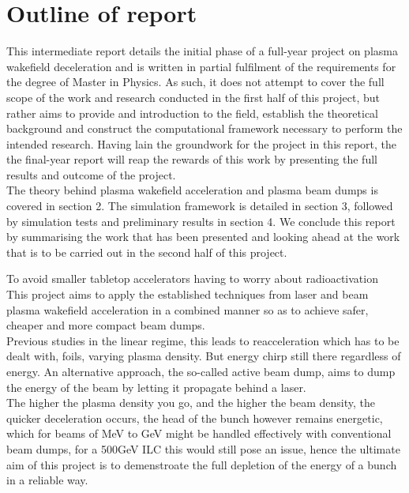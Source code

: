 \section{Outline of report}
This intermediate report details the initial phase of a full-year project on plasma wakefield deceleration and is written in partial fulfilment of the requirements for the degree of Master in Physics. As such, it does not attempt to cover the full scope of the work and research conducted in the first half of this project, but rather aims to provide and introduction to the field, establish the theoretical background and construct the computational framework necessary to perform the intended research. Having lain the groundwork for the project in this report, the the final-year report will reap the rewards of this work by presenting the full results and outcome of the project.\\
The theory behind plasma wakefield acceleration and plasma beam dumps is covered in section 2. The simulation framework is detailed in section 3, followed by simulation tests and preliminary results in section 4. We conclude this report by summarising the work that has been presented and looking ahead at the work that is to be carried out in the second half of this project.


\clearpage
\vfill
To avoid smaller tabletop accelerators having to worry about radioactivation\\
This project aims to apply the established techniques from laser and beam plasma wakefield acceleration in a combined manner so as to achieve safer, cheaper and more compact beam dumps.\\
Previous studies in the linear regime, this leads to reacceleration which has to be dealt with, foils, varying plasma density. But energy chirp still there regardless of energy. An alternative approach, the so-called active beam dump, aims to dump the energy of the beam by letting it propagate behind a laser. \\
The higher the plasma density you go, and the higher the beam density, the quicker deceleration occurs, the head of the bunch however remains energetic, which for beams of MeV to GeV might be handled effectively with conventional beam dumps, for a 500GeV ILC this would still pose an issue, hence the ultimate aim of this project is to demenstroate the full depletion of the energy of a bunch in a reliable way. 



